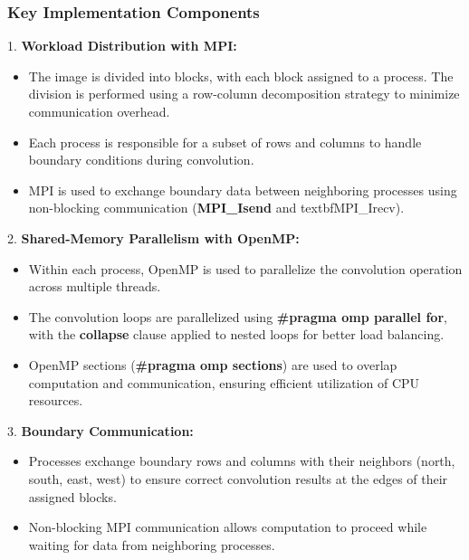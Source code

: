 \documentclass[conference, 10pt]{IEEEtran}
\begin{document}
\subsubsection{Key Implementation Components}
1. \textbf{Workload Distribution with MPI:}
\begin{itemize}

\item The image is divided into blocks, with each block assigned to a process. 
The division is performed using a row-column decomposition strategy to minimize communication overhead.
\item Each process is responsible for a subset of rows and columns to handle boundary conditions during convolution.
\item MPI is used to exchange boundary data between neighboring processes using non-blocking communication (\textbf{MPI_Isend} and textbf{MPI_Irecv}).
\end{itemize}

2. \textbf{Shared-Memory Parallelism with OpenMP:}
\begin{itemize}

\item Within each process, OpenMP is used to parallelize the convolution operation across multiple threads.
\item The convolution loops are parallelized using \textbf{#pragma omp parallel for}, with the \textbf{collapse} clause applied to nested loops for better load balancing.
\item OpenMP sections (\textbf{#pragma omp sections}) are used to overlap computation and communication, ensuring efficient utilization of CPU resources.
\end{itemize}

3. \textbf{Boundary Communication:}

\begin{itemize}

\item Processes exchange boundary rows and columns with their neighbors (north, south, east, west) to ensure correct convolution results at the edges of their assigned blocks.
\item Non-blocking MPI communication allows computation to proceed while waiting for data from neighboring processes.
\end{itemize}
\end{document}
